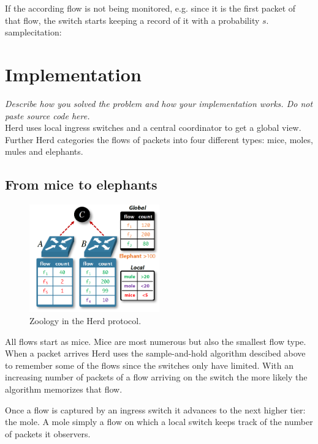 \documentclass[11pt,oneside,a4paper]{article}
\newcommand{\hint}[1]{{\color{blue} \em #1}}
\begin{document}
If the according flow is not being monitored, e.g. since it is the first packet of that flow, the switch starts keeping a record of it with
a probability $s$.\\

samplecitation:\cite{bosshart2014p4}


\section{Implementation}
\hint{Describe how you solved the problem and how your implementation works. Do not paste source code here.} \\
Herd uses local ingress switches and a central coordinator to get a global view. Further Herd categories the flows of packets into four different types: mice, moles, mules and elephants.

\subsection{From mice to elephants} \label{animals}

\begin{figure}
	\centering
	\includegraphics[width=0.5\textwidth, scale=1]{figures/paper_zoo}
	\caption{Zoology in the Herd protocol. \cite{anon2019herd}}
	\label{fig:zoo_fig}
\end{figure}

All flows start as mice. Mice are most numerous but also the smallest flow type. When a packet arrives Herd uses the sample-and-hold algorithm descibed above to remember some of the flows since the switches only have limited. With an increasing number of packets of a flow arriving on the switch the more likely the algorithm memorizes that flow.

Once a flow is captured by an ingress switch it advances to the next higher tier: the mole. A mole simply a flow on which a local switch keeps track of the number of packets it observers.
\end{document}
